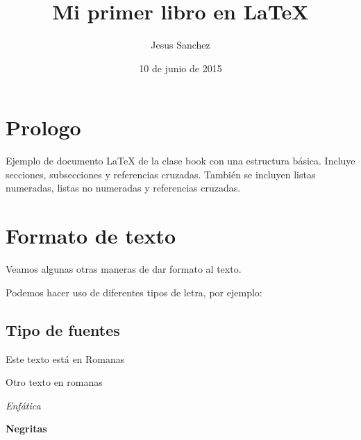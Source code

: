 \documentclass[letterpaper,12pt]{book}
\title{Mi primer libro en \LaTeX{}}
\author{Jesus Sanchez}
\date{10 de junio de 2015}
\begin{document}
\maketitle
\thispagestyle{empty}

\frontmatter %

\tableofcontents

\pagebreak


\chapter*{Prologo}

Ejemplo de documento \LaTeX{} de la clase {\ttfamily book} con una estructura básica. 
Incluye secciones, subsecciones y referencias cruzadas. También se incluyen listas numeradas,
listas no numeradas y referencias cruzadas.


\mainmatter %
\chapter{Formato de texto}

Veamos algunas otras maneras de dar formato al texto.

Podemos hacer uso de diferentes tipos de letra, por ejemplo:


\section{Tipo de fuentes}

\textrm{Este texto está en Romanas}

{\rm Otro texto en romanas}

\smallskip

\emph{Enfática}

\smallskip

\textbf{Negritas}
\end{document}
